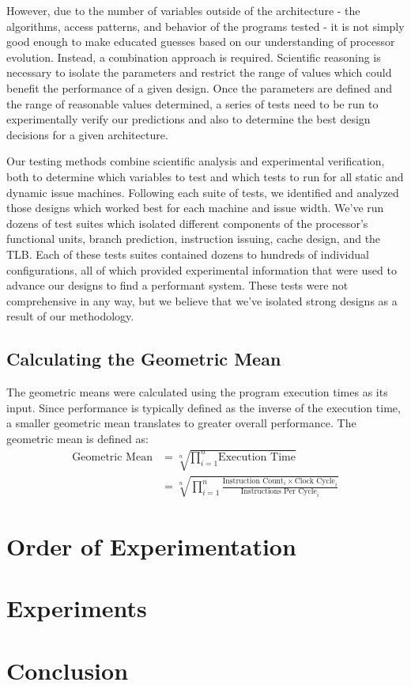 \documentclass[paper=a4, fontsize=12pt]{scrartcl} %
\numberwithin{equation}{section} %
\numberwithin{figure}{section} %
\numberwithin{table}{section} %
\begin{document}
However, due to the number of variables outside of the architecture - the algorithms, access patterns, and behavior of the programs tested - it is not simply good enough to make educated guesses based on our understanding of processor evolution. Instead, a combination approach is required. Scientific reasoning is necessary to isolate the parameters and restrict the range of values which could benefit the performance of a given design. Once the parameters are defined and the range of reasonable values determined, a series of tests need to be run to experimentally verify our predictions and also to determine the best design decisions for a given architecture.

Our testing methods combine scientific analysis and experimental verification, both to determine which variables to test and which tests to run for all static and dynamic issue machines. Following each suite of tests, we identified and analyzed those designs which worked best for each machine and issue width. We've run dozens of test suites which isolated different components of the processor's functional units, branch prediction, instruction issuing, cache design, and the TLB. Each of these tests suites contained dozens to hundreds of individual configurations, all of which provided experimental information that were used to advance our designs to find a performant system. These tests were not comprehensive in any way, but we believe that we've isolated strong designs as a result of our methodology.

\subsection{Calculating the Geometric Mean}

The geometric means were calculated using the program execution times as its input. Since performance is typically defined as the inverse of the execution time, a smaller geometric mean translates to greater overall performance. The geometric mean is defined as:
\begin{align*}
	\text{Geometric Mean} &= \sqrt[n] {\prod_{i=1}^{n} \text{Execution Time}} \\
	&= \sqrt[n] {\prod_{i=1}^{n} \frac{\text{Instruction Count}_i \times \text{Clock Cycle}_i}{\text{Instructions Per Cycle}_i}} 
\end{align*}


\section{Order of Experimentation}



\section{Experiments}



\section{Conclusion}
\end{document}
